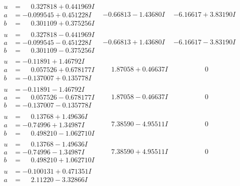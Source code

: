 \documentclass[1p]{elsarticle_modified}
\theoremstyle{definition}
\begin{document}
$$\begin{array}{c|c|c}
 \hline 
\begin{aligned}
u &= \phantom{-}0.327818 + 0.441969 I \\
a &= -0.099545 + 0.451228 I \\
b &= \phantom{-}0.301109 + 0.375256 I\end{aligned}
 & -0.66813 - 1.43680 I & -6.16617 + 3.83190 I \\ \hline\begin{aligned}
u &= \phantom{-}0.327818 - 0.441969 I \\
a &= -0.099545 - 0.451228 I \\
b &= \phantom{-}0.301109 - 0.375256 I\end{aligned}
 & -0.66813 + 1.43680 I & -6.16617 - 3.83190 I \\ \hline\begin{aligned}
u &= -0.11891 + 1.46792 I \\
a &= \phantom{-}0.057526 + 0.678177 I \\
b &= -0.137007 + 0.135778 I\end{aligned}
 & \phantom{-}1.87058 + 0.46637 I & \phantom{-0.000000 } 0 \\ \hline\begin{aligned}
u &= -0.11891 - 1.46792 I \\
a &= \phantom{-}0.057526 - 0.678177 I \\
b &= -0.137007 - 0.135778 I\end{aligned}
 & \phantom{-}1.87058 - 0.46637 I & \phantom{-0.000000 } 0 \\ \hline\begin{aligned}
u &= \phantom{-}0.13768 + 1.49636 I \\
a &= -0.74996 + 1.34987 I \\
b &= \phantom{-}0.498210 - 1.062710 I\end{aligned}
 & \phantom{-}7.38590 - 4.95511 I & \phantom{-0.000000 } 0 \\ \hline\begin{aligned}
u &= \phantom{-}0.13768 - 1.49636 I \\
a &= -0.74996 - 1.34987 I \\
b &= \phantom{-}0.498210 + 1.062710 I\end{aligned}
 & \phantom{-}7.38590 + 4.95511 I & \phantom{-0.000000 } 0 \\ \hline\begin{aligned}
u &= -0.100131 + 0.471351 I \\
a &= \phantom{-}2.11220 - 3.32866 I \\

\end{aligned}
\end{array}$$
\end{document}
